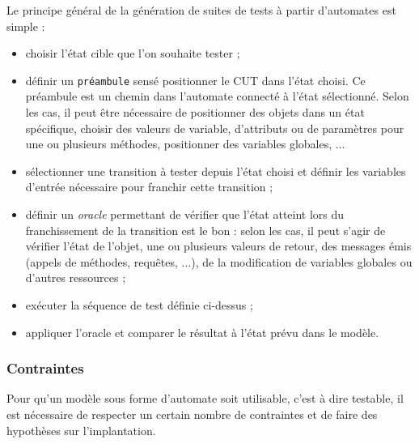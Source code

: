     Le principe g\'en\'eral de la g\'en\'eration de suites de
    tests \`a partir d'automates est simple :
    
\begin{itemize}
       
\item choisir l'\'etat cible que l'on souhaite tester ; 
\item d\'efinir un 
\texttt{pr\'eambule}
   sens\'e
      positionner le CUT dans l'\'etat choisi. Ce pr\'eambule est un
      chemin dans l'automate connect\'e \`a l'\'etat
      s\'electionn\'e. Selon les cas, il peut \^etre n\'ecessaire
      de positionner des objets dans un \'etat sp\'ecifique, choisir
      des valeurs de variable, d'attributs ou de param\`etres pour une
      ou plusieurs m\'ethodes, positionner des variables globales,
      ... 
\item s\'electionner une transition \`a tester depuis l'\'etat
      choisi et d\'efinir les variables d'entr\'ee n\'ecessaire
      pour franchir cette transition ; 
\item d\'efinir un 
\emph{oracle}
   permettant de v\'erifier que
      l'\'etat atteint lors du franchissement de la transition est le
      bon : selon les cas, il peut s'agir de v\'erifier l'\'etat de
      l'objet, une ou plusieurs valeurs de retour, des messages \'emis
      (appels de m\'ethodes, requ\^etes, ...), de la modification de
      variables globales ou d'autres ressources ; 
\item ex\'ecuter la s\'equence de test d\'efinie ci-dessus
     ; 
\item appliquer l'oracle et comparer le r\'esultat \`a l'\'etat pr\'evu
     dans le mod\`ele.
\end{itemize}
  
\par
  
\subsubsection{Contraintes}
  Pour qu'un mod\`ele sous forme d'automate soit utilisable,
    c'est \`a dire testable, il est n\'ecessaire de respecter un certain
    nombre de contraintes et de faire des hypoth\`eses sur
     l'implantation. 
     
